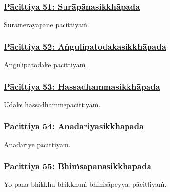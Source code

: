 \subsubsection*{\hyperref[exp51]{Pācittiya 51: Surāpānasikkhāpada}}
\label{pac51}

Surāmerayapāne pācittiyaṁ.



\subsubsection*{\hyperref[exp52]{Pācittiya 52: Aṅgulipatodakasikkhāpada}}
\label{pac52}

Aṅgulipatodake pācittiyaṁ.



\subsubsection*{\hyperref[exp53]{Pācittiya 53: Hassadhammasikkhāpada}}
\label{pac53}

Udake hassadhamme\makeatletter\hyperlink{endnote327-appendix}\makeatother \thinspace pācittiyaṁ.



\subsubsection*{\hyperref[exp54]{Pācittiya 54: Anādariyasikkhāpada}}
\label{pac54}

Anādariye pācittiyaṁ.



\subsubsection*{\hyperref[exp55]{Pācittiya 55: Bhiṁsāpanasikkhāpada}}
\label{pac55}

Yo pana bhikkhu bhikkhuṁ bhiṁsāpeyya, pācittiyaṁ.



